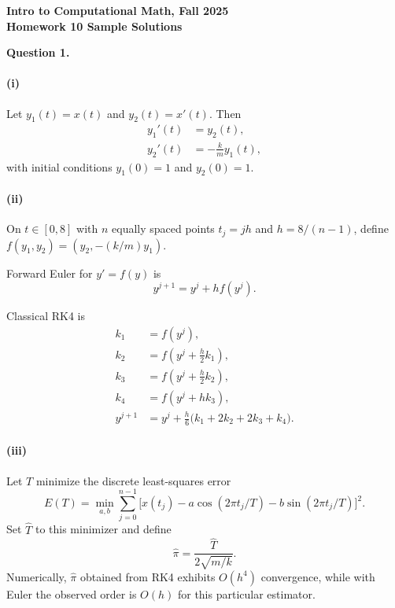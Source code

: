 \documentclass[11pt]{article}
\begin{document}
\begin{center}
{\bf Intro to Computational Math, Fall 2025\\
Homework 10 Sample Solutions}
\end{center}

{\bf Question 1.}

\paragraph{(i)}
Let \(y_{1}(t)=x(t)\) and \(y_{2}(t)=x'(t)\). Then
\[
\begin{aligned}
y_{1}'(t) &= y_{2}(t),\\
y_{2}'(t) &= -\frac{k}{m}y_{1}(t),
\end{aligned}
\]
with initial conditions \(y_{1}(0)=1\) and \(y_{2}(0)=1\).

\paragraph{(ii)}
On \(t\in[0,8]\) with \(n\) equally spaced points \(t_{j}=jh\) and \(h=8/(n-1)\), define \(f(y_{1},y_{2})=(y_{2},-(k/m)y_{1})\).

Forward Euler for \(y'=f(y)\) is
\[
y^{j+1}=y^{j}+h f(y^{j}).
\]

Classical RK4 is
\[
\begin{aligned}
k_{1}&=f(y^{j}),\\
k_{2}&=f(y^{j}+\frac{h}{2}k_{1}),\\
k_{3}&=f(y^{j}+\frac{h}{2}k_{2}),\\
k_{4}&=f(y^{j}+h k_{3}),\\
y^{j+1}&=y^{j}+\frac{h}{6}\bigl(k_{1}+2k_{2}+2k_{3}+k_{4}\bigr).
\end{aligned}
\]

\paragraph{(iii)}
Let \(T\) minimize the discrete least-squares error
\[
E(T)=\min_{a,b}\sum_{j=0}^{n-1}\bigl[x(t_{j})-a\cos(2\pi t_{j}/T)-b\sin(2\pi t_{j}/T)\bigr]^{2}.
\]
Set \(\hat{T}\) to this minimizer and define
\[
\hat{\pi}=\frac{\hat{T}}{2\sqrt{m/k}}.
\]
Numerically, \(\hat{\pi}\) obtained from RK4 exhibits \(O(h^{4})\) convergence, while with Euler the observed order is \(O(h)\) for this particular estimator. 
\end{document}
